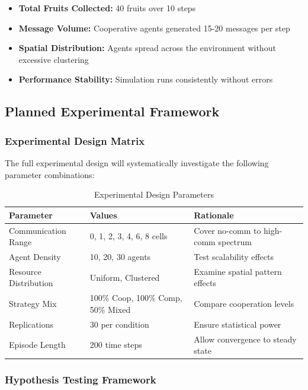 \documentclass[12pt,a4paper]{article}
\begin{document}
\begin{itemize}
    \item \textbf{Total Fruits Collected:} 40 fruits over 10 steps
    \item \textbf{Message Volume:} Cooperative agents generated 15-20 messages per step
    \item \textbf{Spatial Distribution:} Agents spread across the environment without excessive clustering
    \item \textbf{Performance Stability:} Simulation runs consistently without errors
\end{itemize}

\subsection{Planned Experimental Framework}

\subsubsection{Experimental Design Matrix}

The full experimental design will systematically investigate the following parameter combinations:

\begin{table}[h]
\centering
\caption{Experimental Design Parameters}
\label{tab:experimental_design}
\begin{tabular}{@{}lll@{}}
\toprule
\textbf{Parameter} & \textbf{Values} & \textbf{Rationale} \\
\midrule
Communication Range & 0, 1, 2, 3, 4, 6, 8 cells & Cover no-comm to high-comm spectrum \\
Agent Density & 10, 20, 30 agents & Test scalability effects \\
Resource Distribution & Uniform, Clustered & Examine spatial pattern effects \\
Strategy Mix & 100\% Coop, 100\% Comp, 50\% Mixed & Compare cooperation levels \\
Replications & 30 per condition & Ensure statistical power \\
Episode Length & 200 time steps & Allow convergence to steady state \\
\bottomrule
\end{tabular}
\end{table}

\subsubsection{Hypothesis Testing Framework}
\end{document}
